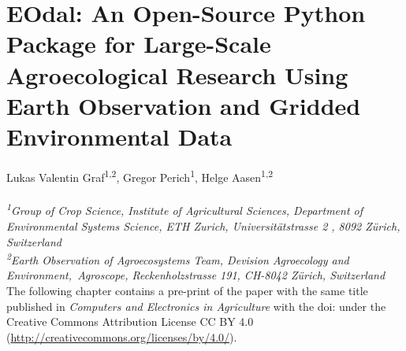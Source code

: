 \chapter{EOdal: An Open-Source Python Package for Large-Scale Agroecological Research Using Earth Observation and Gridded Environmental Data}
\label{chap:eodal}
\graphicspath{{./02-EOdal/img}}

Lukas Valentin Graf\textsuperscript{1,2}, Gregor Perich\textsuperscript{1}, Helge Aasen\textsuperscript{1,2}
\\
\normalsize
\vspace{2pt}
\\
\textit{\textsuperscript{1}Group of Crop Science, Institute of Agricultural Sciences, Department of Environmental Systems Science, ETH Zurich, Universitätstrasse 2 , 8092 Zürich, Switzerland
\\
\textsuperscript{2}Earth Observation of Agroecosystems Team, Devision Agroecology and Environment,\ Agroscope, Reckenholzstrasse 191, CH-8042 Zürich, Switzerland
\vspace{2cm}}
\\

The following chapter contains a pre-print of the paper with the same title published in \textsl{Computers and Electronics in Agriculture} with the doi:  under the Creative Commons Attribution License CC BY 4.0 (\url{http://creativecommons.org/licenses/by/4.0/}).


